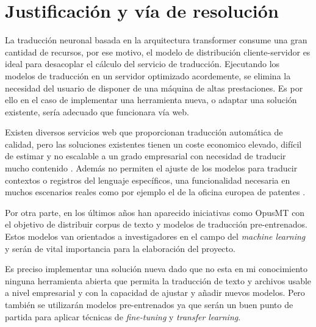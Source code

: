 \chapter{Justificación y vía de resolución}
La traducción neuronal basada en la arquitectura transformer consume una gran cantidad de recursos,
por ese motivo, el modelo de distribución cliente-servidor es ideal para desacoplar el cálculo del
servicio de traducción. Ejecutando los modelos de traducción en un servidor optimizado acordemente,
se elimina la necesidad del usuario de disponer de una máquina de altas prestaciones. Es por ello
en el caso de implementar una herramienta nueva, o adaptar una solución existente, sería adecuado
que funcionara vía web.

Existen diversos servicios web que proporcionan traducción automática de calidad, pero las soluciones
existentes tienen un coste economico elevado, difícil de estimar y no escalable a un grado
empresarial con necesidad de traducir mucho contenido \cite{GoogleTranslatePricing,AWSTranslatePricing,MicrosoftTranslatePricing}.
Además no permiten el ajuste de los modelos para traducir contextos o registros del lenguaje
específicos, una funcionalidad necesaria en muchos escenarios reales como por ejemplo el de la oficina
europea de patentes \cite{PatentOffice2020Jul}.

Por otra parte, en los últimos años han aparecido iniciativas como OpusMT
\cite{HelsinkiTiedemannThottingal2020} con el objetivo de distribuir corpus de texto y modelos de
traducción pre-entrenados. Estos modelos van orientados a investigadores en el campo del
\textit{machine learning} y serán de vital importancia para la elaboración del proyecto.

Es preciso implementar una solución nueva dado que no esta en mi conocimiento ninguna
herramienta abierta que permita la traducción de texto y archivos usable a nivel empresarial
y con la capacidad de ajustar y añadir nuevos modelos. Pero también se utilizarán modelos
pre-entrenados ya que serán un buen punto de partida para aplicar técnicas de
\textit{fine-tuning} y \textit{transfer learning}.

